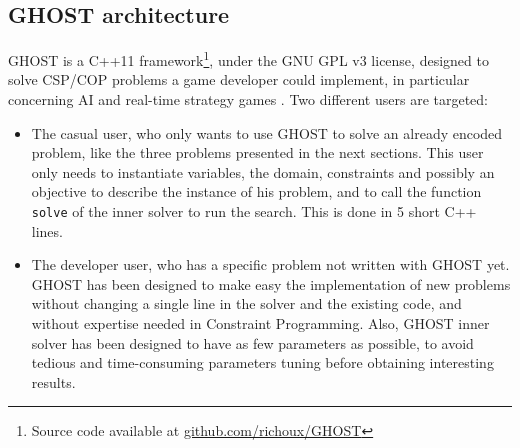 \documentclass[journal]{IEEEtran}
\newcommand{\minormod}[1]{\color{red} #1\color{black} \xspace}
\newcommand{\csp}{\textsc{CSP}\xspace}
\newcommand{\cop}{\textsc{COP}\xspace}
\newcommand{\ghost}{\textsc{GHOST}\xspace}
\begin{document}
\subsection{\ghost architecture}

\ghost  is a  C++11 framework\footnote{Source  code available  at
  \href{https://github.com/richoux/GHOST}{github.com/richoux/GHOST}},
under  the  GNU  GPL  v3  license,  designed  to  solve  \minormod{\csp/\cop problems a game developer could implement, in particular concerning AI and real-time strategy games}. Two different users are targeted:
\begin{itemize}
\item  The casual  user, who  only  wants to  use \ghost  to solve  an
  already encoded problem,  like the three problems  presented in the next
  sections.   This  user  only  needs to  instantiate  variables,  the
  domain,  constraints and possibly  an objective  to describe  the
  instance of his problem, and  to call the function \texttt{solve} of
  the inner solver to run the search. This is done in 5 short C++ lines.
\item The developer user, who has  a specific problem not written with
  \ghost yet.  \ghost  has been designed to make easy the implementation of
  new problems without changing a single line in  the solver and
  the  existing  code,  and  without expertise  needed  in  Constraint
  Programming.   Also, \ghost inner  solver has  been designed  to have  as few
  parameters  as   possible,  to  avoid  tedious   and  time-consuming
  parameters tuning before obtaining interesting results.
\end{itemize}
\end{document}
